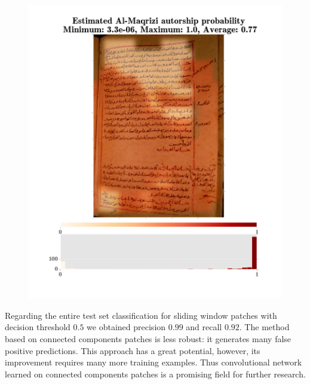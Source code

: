\documentclass[conference,a4paper,twocolumn]{IEEEtran}
\begin{document}
\begin{figure}
\begin{minipage}{.48\linewidth}
  \includegraphics[width=\linewidth]{figures/hitat_15.png}
\end{minipage}
	\label{fig:al_maqrizi_classification_example}
\end{figure}

Regarding the entire test set classification for sliding window patches with decision threshold $0.5$ we obtained precision $0.99$ and recall $0.92$. The method based on connected components patches is less robust: it generates many false positive predictions. This approach has a great potential, however, its improvement requires many more training examples. Thus convolutional network learned on connected components patches is a promising field for further research.
\end{document}
